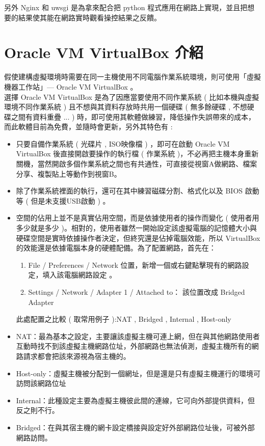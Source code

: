 \documentclass[14pt,a4paper]{report}  %
\begin{document}
 另外 Nginx 和 uwsgi 是為拿來配合把 python 程式應用在網路上實現，並且把想要的結果使其能在網路實時觀看操控結果之反饋。\\
\section{Oracle VM VirtualBox 介紹}
 假使建構虛擬環境時需要在同一主機使用不同電腦作業系統環境，則可使用「虛擬機器工作站」— Oracle VM VirtualBox 。\\

 選擇 Oracle VM VirtualBox    是為了因應當要使用不同作業系統 ( 比如本機與虛擬環境不同作業系統  ) 且不想與其資料存放時共用一個硬碟 ( 無多餘硬碟 , 不想硬碟之間有資料重疊 ... ) 時，即可使用其軟體做練習，降低操作失誤帶來的成本，而此軟體目前為免費，並隨時會更新，另外其特色有 :\\  
\begin{itemize}


\item 只要自備作業系統 ( 光碟片 , ISO映像檔 ) ，即可在啟動 Oracle VM VirtualBox  後直接開啟要操作的執行檔 ( 作業系統 )，不必再把主機本身重新關機，當然開啟多個作業系統之間也有共通性，可直接從視窗A做網路、檔案分享、複製貼上等動作到視窗B。\\
\item 除了作業系統裡面的執行，還可在其中練習磁碟分割、格式化以及 BIOS 啟動等 ( 但是未支援USB啟動 ) 。\\
\item 空間的佔用上並不是真實佔用空間，而是依據使用者的操作而變化 ( 使用者用多少就是多少 )。相對的，使用者雖然一開始設定該虛擬電腦的記憶體大小與硬碟空間是實時依據操作者決定，但終究還是佔掉電腦效能，所以 VirtualBox 的效能還是依據電腦本身的硬體配備。為了配置網路，首先在：
\begin{enumerate}
\item File / Preferences / Network  位置，新增一個或右鍵點擊現有的網路設定，填入該電腦網路設定 。
\item Settings / Network / Adapter 1 / Attached to： 該位置改成  Bridged Adapter
\end{enumerate}
\qquad 此處配置之比較 ( 取常用例子 ):NAT , Bridged , Internal , Host-only
\item NAT：最為基本之設定，主要讓該虛擬主機可連上網，但在與其他網路使用者互動時找不到該虛擬主機網路位址，外部網路也無法偵測，虛擬主機所有的網路請求都會把該來源視為宿主機的。
\item Host-only：虛擬主機被分配到一個網址，但是還是只有虛擬主機運行的環境可訪問該網路位址
\item Internal：此種設定主要為虛擬主機彼此間的連線，它可向外部提供資料，但反之則不行。
\item Bridged：在與其宿主機的網卡設定橋接與設定好外部網路位址後，可被外部網路訪問。
\end{itemize}
\newpage
\end{document}
